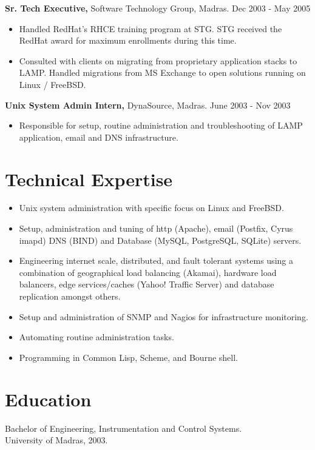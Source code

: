 \documentclass[margin]{res}
\begin{document}
\begin{resume}
\begin{itemize}
 \end{itemize}

{\bf Sr. Tech Executive,} Software Technology Group, Madras. \hfill Dec 2003 - May 2005
 \begin{itemize} \itemsep -2pt
 \item Handled RedHat's RHCE training program at STG. STG received the RedHat
   award for maximum enrollments during this time.
 \item Consulted with clients on migrating from proprietary application stacks
   to LAMP. Handled migrations from MS Exchange to open solutions running on 
   Linux / FreeBSD.
   
 \end{itemize}

{\bf Unix System Admin Intern,} DynaSource, Madras. \hfill June 2003 - Nov 2003
 \begin{itemize} \itemsep -2pt
 \item Responsible for setup, routine administration and troubleshooting 
   of LAMP \\ application, email and DNS infrastructure.
   
 \end{itemize}

\section{Technical Expertise} 
 \begin{itemize} \itemsep -2pt
 \item Unix system administration with specific focus on Linux and FreeBSD.
 \item Setup, administration and tuning of http (Apache), email (Postfix, Cyrus imapd)
   DNS (BIND) and Database (MySQL, PostgreSQL, SQLite) servers.
 \item Engineering internet scale, distributed, and fault tolerant systems 
   using a combination of geographical load balancing (Akamai), hardware load 
   balancers, edge services/caches (Yahoo! Traffic Server) and database replication 
   amongst others.
 \item Setup and administration of SNMP and Nagios for infrastructure monitoring.
 \item Automating routine administration tasks.
 \item Programming in Common Lisp, Scheme, and Bourne shell.
   
 \end{itemize}

\section{Education} 
Bachelor of Engineering, Instrumentation and Control Systems.\\
University of Madras, 2003.


\end{resume} 
\end{document}
